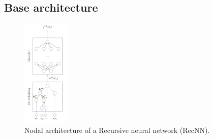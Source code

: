 \subsection{Base architecture}

\begin{figure}
    \centering
    \includegraphics[width=0.2\textwidth]{Images/RecNN_architecture.png}
    \caption{Nodal architecture of a Recursive neural network (RecNN).}
    \label{fig:recnn_architecture}
\end{figure}

